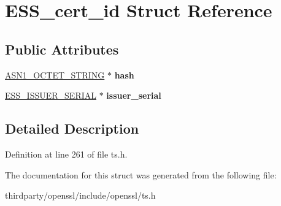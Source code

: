 \hypertarget{struct_e_s_s__cert__id}{}\section{E\+S\+S\+\_\+cert\+\_\+id Struct Reference}
\label{struct_e_s_s__cert__id}
\subsection*{Public Attributes}
\begin{DoxyCompactItemize}
\item 
\mbox{\label{struct_e_s_s__cert__id_a54fc1707932a1ce31d87b48a86bdb22a}} 
\hyperlink{structasn1__string__st}{A\+S\+N1\+\_\+\+O\+C\+T\+E\+T\+\_\+\+S\+T\+R\+I\+NG} $\ast$ {\bfseries hash}
\item 
\mbox{\label{struct_e_s_s__cert__id_a17dc9c926a3f936f0a9417486d7a55c9}} 
\hyperlink{struct_e_s_s__issuer__serial}{E\+S\+S\+\_\+\+I\+S\+S\+U\+E\+R\+\_\+\+S\+E\+R\+I\+AL} $\ast$ {\bfseries issuer\+\_\+serial}
\end{DoxyCompactItemize}


\subsection{Detailed Description}


Definition at line 261 of file ts.\+h.



The documentation for this struct was generated from the following file\+:\begin{DoxyCompactItemize}
\item 
thirdparty/openssl/include/openssl/ts.\+h\end{DoxyCompactItemize}
